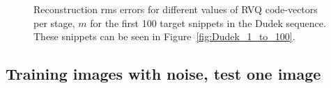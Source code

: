 								\begin{figure}
								\centering
								\subtable{\begin{tiny}\end{tiny}}
								\caption{Reconstruction rms errors for different values of RVQ code-vectors per stage, $m$ for the first 100 target snippets in the Dudek sequence.  These snippets can be seen in Figure~\ref{fig:Dudek_1_to_100}.}
								\label{fig:aRVQ_Dudek_first_100}
								\end{figure}

\clearpage
\newpage
\subsection{Training images with noise, test one image}


